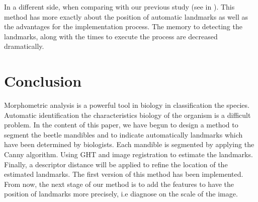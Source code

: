 \documentclass[twoside,twocolumn,10pt]{article}
\begin{document}
In a different side, when comparing with our previous study (see in
\cite{leestimating}). This method has more exactly about the position of
automatic landmarks as well as the advantages for the implementation
process. The memory to detecting the landmarks, along with the times
to execute the process are decreased dramatically.

\section{Conclusion}
Morphometric analysis is a powerful tool in biology in classification
the species. Automatic identification the characteristics biology of
the organism is a difficult problem. In the content of this paper, we
have begun to design a method to segment the beetle mandibles and to
indicate automatically landmarks which have been determined by
biologists. Each mandible is segmented by applying the Canny
algorithm. Using GHT and image registration to estimate the
landmarks. Finally, a descriptor distance will be applied to refine the
location of the estimated landmarks. The first version of this method
has been implemented. From now, the next stage of our method is to add
the features to have the position of landmarks more precisely, i.e diagnose on the scale of the image.




\end{document}
